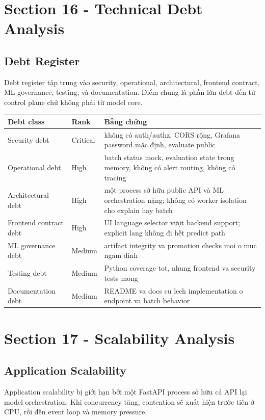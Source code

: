 \section{Section 16 - Technical Debt Analysis}
\subsection{Debt Register}
Debt register tập trung vào security, operational, architectural, frontend contract, ML governance, testing, và documentation. Điểm chung là phần lớn debt đến từ control plane chứ không phải từ model core.

\begin{table}[H]
\centering
\begin{tabularx}{\textwidth}{@{}l l X@{}}
\toprule
\textbf{Debt class} & \textbf{Rank} & \textbf{Bằng chứng} \\
\midrule
Security debt & Critical & không có auth/authz, CORS rộng, Grafana password mặc định, evaluate public \\
Operational debt & High & batch status mock, evaluation state trong memory, không có alert routing, không có tracing \\
Architectural debt & High & một process sở hữu public API và ML orchestration nặng; không có worker isolation cho explain hay batch \\
Frontend contract debt & High & UI language selector vượt backend support; explicit lang không đi hết predict path \\
ML governance debt & Medium & artifact integrity va promotion checks moi o muc ngam dinh \\
Testing debt & Medium & Python coverage tot, nhung frontend va security tests mong \\
Documentation debt & Medium & README va docs cu lech implementation o endpoint va batch behavior \\
\bottomrule
\end{tabularx}
\end{table}

\section{Section 17 - Scalability Analysis}
\subsection{Application Scalability}
Application scalability bị giới hạn bởi một FastAPI process sở hữu cả API lại model orchestration. Khi concurrency tăng, contention sẽ xuất hiện trước tiên ở CPU, rồi đến event loop và memory pressure.

